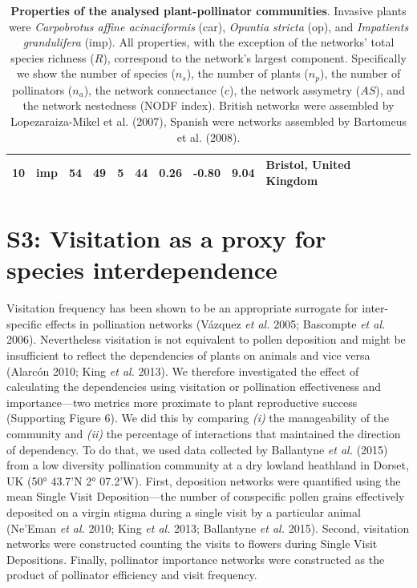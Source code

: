 \documentclass[a4paper]{artikel1}
\begin{document}
\begin{table}[ht]
\begin{tabular}{rlrrrrrrrl}
   10 & imp &  54 &  49 &   5 &  44 & 0.26 & -0.80 & 9.04 & Bristol, United Kingdom \\ 
   \hline
\end{tabular}
\caption{\textbf{Properties of the analysed plant-pollinator communities}. Invasive plants were \textit{Carpobrotus affine acinaciformis} (car), \textit{Opuntia stricta} (op), and \textit{Impatients grandulifera} (imp). All properties, with the exception of the networks' total species richness ($R$), correspond to the network's largest component. Specifically we show the number of species ($n_s$), the number of plants ($n_p$), the number of pollinators ($n_a$), the network connectance ($c$), the network assymetry ($AS$), and the network nestedness (NODF index). British networks were assembled by Lopezaraiza-Mikel et al. (2007), Spanish were networks assembled by Bartomeus et al. (2008).} 
\end{table}

\section{S3: Visitation as a proxy for species
interdependence}\label{s3-visitation-as-a-proxy-for-species-interdependence}

Visitation frequency has been shown to be an appropriate surrogate for
inter-specific effects in pollination networks (Vázquez \emph{et al.}
2005; Bascompte \emph{et al.} 2006). Nevertheless visitation is not
equivalent to pollen deposition and might be insufficient to reflect the
dependencies of plants on animals and vice versa (Alarcón 2010; King
\emph{et al.} 2013). We therefore investigated the effect of calculating
the dependencies using visitation or pollination effectiveness and
importance---two metrics more proximate to plant reproductive success
(Supporting Figure 6). We did this by comparing \emph{(i)} the
manageability of the community and \emph{(ii)} the percentage of
interactions that maintained the direction of dependency. To do that, we
used data collected by Ballantyne \emph{et al.} (2015) from a low
diversity pollination community at a dry lowland heathland in Dorset, UK
(50° 43.7'N 2° 07.2'W). First, deposition networks were quantified using
the mean Single Visit Deposition---the number of conspecific pollen
grains effectively deposited on a virgin stigma during a single visit by
a particular animal (Ne'Eman \emph{et al.} 2010; King \emph{et al.}
2013; Ballantyne \emph{et al.} 2015). Second, visitation networks were
constructed counting the visits to flowers during Single Visit
Depositions. Finally, pollinator importance networks were constructed as
the product of pollinator efficiency and visit frequency.
\end{document}
